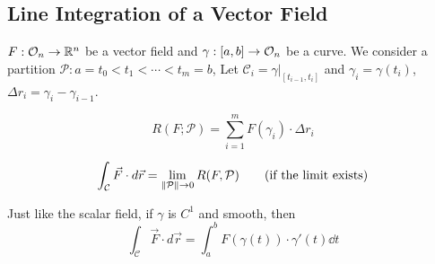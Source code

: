 \documentclass[../Analysis-3]{subfiles}
\begin{document}
\subsection{Line Integration of a Vector Field}

$F:\mathcal{O}_{n} \to \mathbb{R}^n$ be a vector field and $\gamma:[a,b] \to \mathcal{O}_{n}$ be a curve. We consider a partition $\mathcal{P}: a =t_0<t_1<\cdots < t_m=b$, Let $\mathcal{C}_i = \gamma|_{[t_{i-1},t_i]}$ and $\gamma_i = \gamma(t_i)$, $\Delta r_i = \gamma_{i} - \gamma_{i-1}$.

\[R(F;\mathcal{P})= \sum_{i=1}^m F(\gamma_i)\cdot \Delta r_i\]

\begin{align*}
    \int_{\mathcal{C}} \vec{F}\cdot d\vec{r} = \lim_{\norm{\mathcal{P}}\to 0} R(F,\mathcal{P}) \tag{if the limit exists}
\end{align*}

Just like the scalar field, if $\gamma$ is $C^1$ and smooth, then
\begin{equation}
    \int_{\mathcal{C}} \vec{F}\cdot d\vec{r} = \int_a^b F(\gamma(t))\cdot \gamma'(t) \dd t \label{eq:3}
\end{equation}
\end{document}
